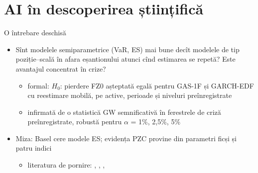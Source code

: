 \section{AI în descoperirea științifică}

\begin{frame}{O întrebare deschisă}
\itemsize{\small}
\begin{itemize}
    \item Sînt modelele semiparametrice (VaR, ES) mai bune decît modelele de tip poziție--scală în afara eșantionului atunci cînd estimarea se repetă? Este avantajul concentrat în crize?
    \begin{itemize}
        \item formal: $H_0$: pierdere FZ0 așteptată egală pentru GAS-1F și GARCH-EDF cu reestimare mobilă, pe active, perioade și niveluri preînregistrate
        \item infirmată de o statistică GW semnificativă în ferestrele de criză preînregistrate, robustă pentru $\alpha$ = 1\%, 2,5\%, 5\%
    \end{itemize}
    \item Miza: Basel cere modele ES; evidența PZC provine din parametri ficși și patru indici
    \begin{itemize}
        \item literatura de pornire: , , , 
    \end{itemize}
\end{itemize}
\end{frame}

